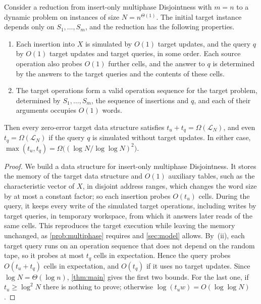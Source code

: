\begin{lemma}[Transfer]\label{lem:app-transfer}
Consider a reduction from insert-only multiphase Disjointness with $m=n$ to a dynamic problem on instances of size $N=n^{\Theta(1)}$. The initial target instance depends only on $S_1,\dots,S_m$, and the reduction has the following properties.
\begin{enumerate}[label=(\roman*), leftmargin=*]
  \item Each insertion into $X$ is simulated by $O(1)$ target updates, and the query $q$ by $O(1)$ target updates and target queries, in some order. Each source operation also probes $O(1)$ further cells, and the answer to $q$ is determined by the answers to the target queries and the contents of these cells.
  \item The target operations form a valid operation sequence for the target problem, determined by $S_1,\dots,S_m$, the sequence of insertions and $q$, and each of their arguments occupies $O(1)$ words.
\end{enumerate}
Then every zero-error target data structure satisfies $t_u+t_q=\Omega(\mathcal L_N)$, and even $t_q=\Omega(\mathcal L_N)$ if the query $q$ is simulated without target updates. In either case, $\max(t_u,t_q)=\Omega\big((\log N/\log\log N)^2\big)$.
\end{lemma}
\begin{proof}
We build a data structure for insert-only multiphase Disjointness. It stores the memory of the target data structure and $O(1)$ auxiliary tables, such as the characteristic vector of $X$, in disjoint address ranges, which changes the word size by at most a constant factor; so each insertion probes $O(t_u)$ cells. During the query, it keeps every write of the simulated target operations, including writes by target queries, in temporary workspace, from which it answers later reads of the same cells. This reproduces the target execution while leaving the memory unchanged, as \cref{prob:multiphase} requires and \cref{sec:model} allows. By~(ii), each target query runs on an operation sequence that does not depend on the random tape, so it probes at most $t_q$ cells in expectation. Hence the query probes $O(t_u+t_q)$ cells in expectation, and $O(t_q)$ if it uses no target updates. Since $\log N=\Theta(\log n)$, \cref{thm:main} gives the first two bounds. For the last one, if $t_u\ge\log^2N$ there is nothing to prove; otherwise $\log(t_uw)=O(\log\log N)$.
\end{proof}

